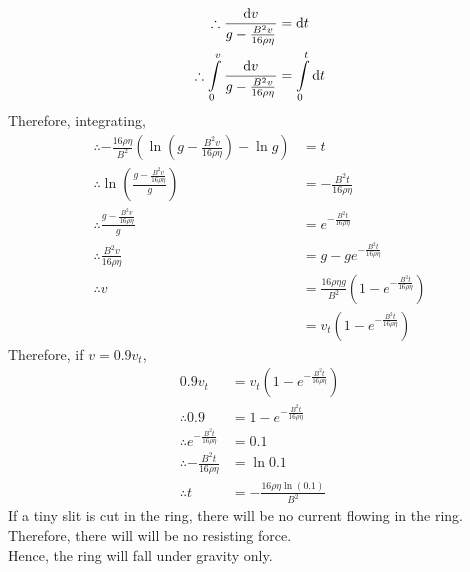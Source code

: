\documentclass[fleqn, a4paper, 11pt, oneside]{amsart}
\theoremstyle{definition}
\theoremstyle{theorem}
\begin{document}
\begin{solution}
\begin{align*}
		\therefore \frac{\dif v}{g - \frac{B^2 v}{16 \rho \eta}} &= \dif t\\
		\therefore \int\limits_{0}^{v} \frac{\dif v}{g - \frac{B^2 v}{16 \rho \eta}} &= \int\limits_{0}^{t} \dif t
	\end{align*}
	Therefore, integrating,
	\begin{align*}
		\therefore -\frac{16 \rho \eta}{B^2} \left( \ln\left( g - \frac{B^2 v}{16 \rho \eta} \right) - \ln g \right) &= t\\
		\therefore \ln\left( \frac{g - \frac{B^2 v}{16 \rho \eta}}{g} \right) &= -\frac{B^2 t}{16 \rho \eta}\\
		\therefore \frac{g - \frac{B^2 v}{16 \rho \eta}}{g} &= e^{-\frac{B^2 t}{16 \rho \eta}}\\
		\therefore \frac{B^2 v}{16 \rho \eta} &= g - g e^{-\frac{B^2 t}{16 \rho \eta}}\\
		\therefore v &= \frac{16 \rho \eta g}{B^2} \left( 1 - e^{-\frac{B^2 t}{16 \rho \eta}} \right)\\
		&= v_t \left( 1 - e^{-\frac{B^2 t}{16 \rho \eta}} \right)
	\end{align*}
	Therefore, if $v = 0.9 v_t$,
	\begin{align*}
		0.9 v_t &= v_t \left( 1 - e^{-\frac{B^2 t}{16 \rho \eta}} \right)\\
		\therefore 0.9 &= 1 - e^{-\frac{B^2 t}{16 \rho \eta}}\\
		\therefore e^{-\frac{B^2 t}{16 \rho \eta}} &= 0.1\\
		\therefore -\frac{B^2 t}{16 \rho \eta} &= \ln 0.1\\
		\therefore t &= -\frac{16 \rho \eta \ln(0.1)}{B^2}
	\end{align*}
	If a tiny slit is cut in the ring, there will be no current flowing in the ring.\\
	Therefore, there will will be no resisting force.\\
	Hence, the ring will fall under gravity only.
\end{solution}
\end{document}
